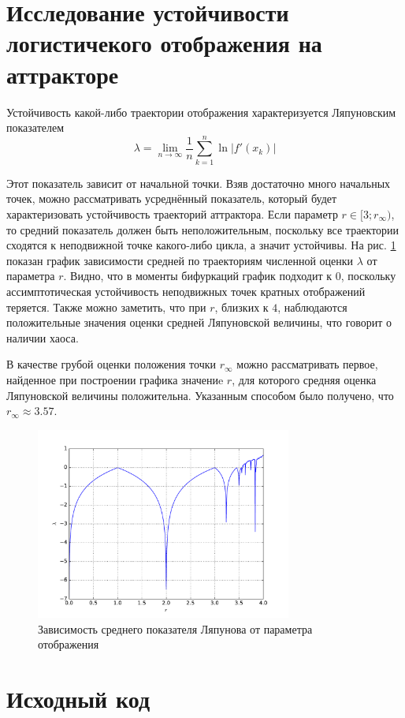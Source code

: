 \documentclass[a4paper]{article}
\begin{document}
\section{Исследование устойчивости логистичекого отображения на аттракторе}

Устойчивость какой-либо траектории отображения характеризуется Ляпуновским показателем
\begin{displaymath}
\lambda = \lim_{n \to \infty} \frac{1}{n}\sum_{k=1}^{n}\ln|f'(x_k)|
\end{displaymath}

Этот показатель зависит от начальной точки. Взяв достаточно много начальных точек,
можно рассматривать усреднённый показатель, который будет характеризовать устойчивость
траекторий аттрактора. Если параметр \(r\in [3;r_\infty)\), то средний показатель
должен быть неположительным, поскольку все траектории сходятся к неподвижной точке
какого-либо цикла, а значит устойчивы. На рис. \ref{fig:lyapunov_characteristic}
показан график зависимости средней по траекториям численной оценки \(\lambda\) от параметра \(r\).
Видно, что в моменты бифуркаций график подходит к \(0\), поскольку ассимптотическая
устойчивость неподвижных точек кратных отображений теряется. Также можно заметить, что
при \(r\), близких к \(4\), наблюдаются положительные значения оценки средней Ляпуновской величины,
что говорит о наличии хаоса.

В качестве грубой оценки положения точки \(r_\infty\) можно рассматривать первое, найденное
при построении графика значениe \(r\), для которого средняя оценка Ляпуновской величины положительна.
Указанным способом было получено, что \(r_\infty \approx 3.57\).

\begin{figure}[H]
	\center
	\includegraphics[width=0.75\textwidth]{../pictures/lab6_lyapunov_characteristic.pdf}
	\caption{Зависимость среднего показателя Ляпунова от параметра отображения}
	\label{fig:lyapunov_characteristic}
\end{figure}

\section{Исходный код}

\end{document}
